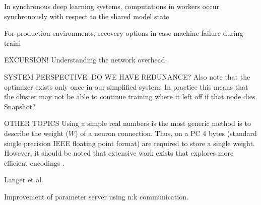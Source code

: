 In synchronous deep learning systems, computations in workers occur synchronously with respect to the shared model state



For production environments, recovery options in case machine failure during traini




EXCURSION!
Understanding the network overhead.




SYSTEM PERSPECTIVE: DO WE HAVE REDUNANCE?  Also note that the optimizer exists only once in our simplified system. In practice this means that the cluster may not be able to continue training where it left off if that node dies. Snapshot?




OTHER TOPICS
Using a simple real numbers is the most generic method is to describe the weight ($W$) of a neuron connection. Thus, on a PC 4 bytes (standard single precision IEEE floating point format) are required to store a single weight. However, it should be noted that extensive work exists that explores more efficient encodings \cite{a,b,c}. 


Langer et al.


Improvement of parameter server using n:k communication.






